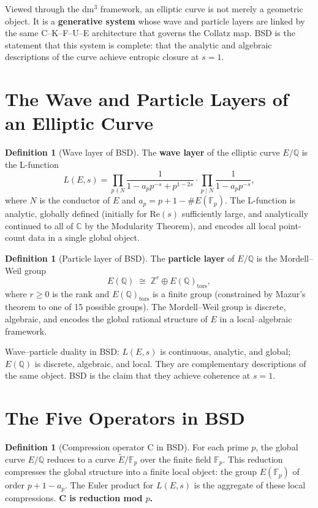 \documentclass[14pt, twoside, openright]{book}
\theoremstyle{definition}
\newtheorem{definition}[theorem]{Definition}
\theoremstyle{remark}
\begin{document}
Viewed through the dm$^{3}$ framework, an elliptic curve is not merely a
geometric object. It is a \textbf{generative system} whose wave and particle
layers are linked by the same C--K--F--U--E architecture that governs the Collatz
map. BSD is the statement that this system is complete: that the analytic and
algebraic descriptions of the curve achieve entropic closure at $s = 1$.

\section{The Wave and Particle Layers of an Elliptic Curve}

\begin{definition}[Wave layer of BSD]
The \textbf{wave layer} of the elliptic curve $E/\mathbb{Q}$ is the L-function
\[
  L(E, s) = \prod_{p \nmid N} \frac{1}{1 - a_p p^{-s} + p^{1-2s}}
            \cdot \prod_{p \mid N} \frac{1}{1 - a_p p^{-s}},
\]
where $N$ is the conductor of $E$ and $a_p = p + 1 - \#E(\mathbb{F}_p)$. The
L-function is analytic, globally defined (initially for $\mathrm{Re}(s)$
sufficiently large, and analytically continued to all of $\mathbb{C}$ by the
Modularity Theorem), and encodes all local point-count data in a single global
object.
\end{definition}

\begin{definition}[Particle layer of BSD]
The \textbf{particle layer} of $E/\mathbb{Q}$ is the Mordell--Weil group
\[
  E(\mathbb{Q}) \;\cong\; \mathbb{Z}^{r} \oplus E(\mathbb{Q})_{\mathrm{tors}},
\]
where $r \geq 0$ is the rank and $E(\mathbb{Q})_{\mathrm{tors}}$ is a finite
group (constrained by Mazur's theorem to one of 15 possible groups). The
Mordell--Weil group is discrete, algebraic, and encodes the global rational
structure of $E$ in a local--algebraic framework.
\end{definition}

Wave--particle duality in BSD: $L(E,s)$ is continuous, analytic, and global;
$E(\mathbb{Q})$ is discrete, algebraic, and local. They are complementary
descriptions of the same object. BSD is the claim that they achieve coherence
at $s = 1$.

\section{The Five Operators in BSD}

\begin{definition}[Compression operator C in BSD]
For each prime $p$, the global curve $E/\mathbb{Q}$ reduces to a curve
$\tilde{E}/\mathbb{F}_p$ over the finite field $\mathbb{F}_p$. This reduction
compresses the global structure into a finite local object: the group
$E(\mathbb{F}_p)$ of order $p + 1 - a_p$. The Euler product for $L(E,s)$ is
the aggregate of these local compressions. \textbf{C is reduction mod $p$.}
\end{definition}
\end{document}
